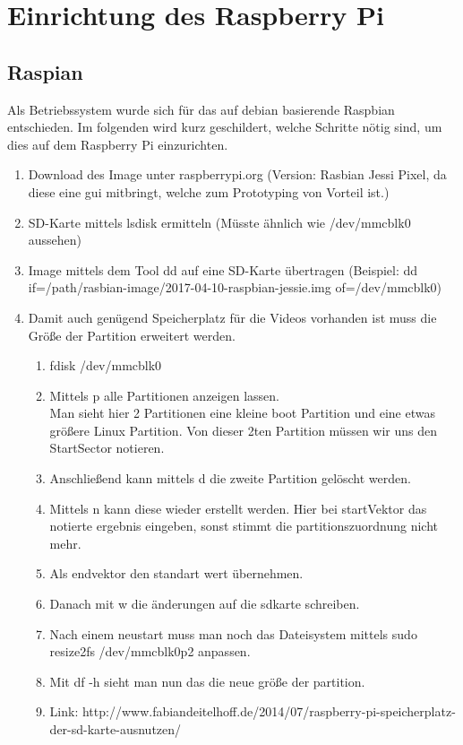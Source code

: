 \section{Einrichtung des Raspberry Pi}
\label{sec:Einrichtung_Raspi}
\subsection{Raspian}

Als Betriebssystem wurde sich für das auf debian basierende Raspbian entschieden. Im folgenden wird kurz geschildert, welche Schritte nötig sind, um dies auf dem Raspberry Pi einzurichten.



\begin{enumerate}
  \item Download des Image unter raspberrypi.org (Version: Rasbian Jessi Pixel, da diese eine gui mitbringt, welche zum Prototyping von Vorteil ist.)
  \item SD-Karte mittels lsdisk ermitteln (Müsste ähnlich wie /dev/mmcblk0 aussehen)
  \item Image mittels dem Tool dd auf eine SD-Karte übertragen (Beispiel: dd if=/path/rasbian-image/2017-04-10-raspbian-jessie.img of=/dev/mmcblk0)
  \item Damit auch genügend Speicherplatz für die Videos vorhanden ist muss die Größe der Partition erweitert werden. \\
  \begin {enumerate}
    \item fdisk /dev/mmcblk0
    \item Mittels p alle Partitionen anzeigen lassen. \\ Man sieht hier 2 Partitionen eine kleine boot Partition und eine etwas größere Linux Partition. Von dieser 2ten   Partition müssen wir uns den StartSector notieren. 
    \item Anschließend kann mittels d die zweite Partition gelöscht werden. 
    \item Mittels n kann diese wieder erstellt werden. Hier bei startVektor das notierte ergebnis eingeben, sonst stimmt die partitionszuordnung nicht mehr. 
    \item Als endvektor den standart wert übernehmen.
    \item Danach mit w die änderungen auf die sdkarte schreiben.
    \item Nach einem neustart muss man noch das Dateisystem mittels sudo resize2fs /dev/mmcblk0p2 anpassen.
    \item Mit df -h sieht man nun das die neue größe der partition.
    \item Link: http://www.fabiandeitelhoff.de/2014/07/raspberry-pi-speicherplatz-der-sd-karte-ausnutzen/
  \end{enumerate}
\end{enumerate}




